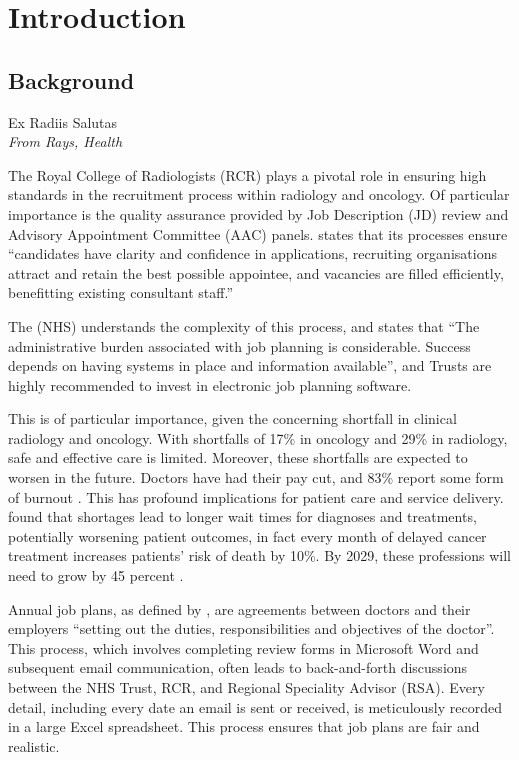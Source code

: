 \chapter{Introduction}
\section{Background} \label{Background}
\epigraph{Ex Radiis Salutas\\\textit{From Rays, Health}}{}
The Royal College of Radiologists (RCR) plays a pivotal role in ensuring high standards in the recruitment process within radiology and oncology. Of particular importance is the quality assurance provided by Job Description (JD) review and Advisory Appointment Committee (AAC) panels.  \textcite{the_royal_college_of_radiologists_clinical_2022} states that its processes ensure “candidates have clarity and confidence in applications, recruiting organisations attract and retain the best possible appointee, and vacancies are filled efficiently, benefitting existing consultant staff.” 

The \textcite{national_health_service_consultant_2017} (NHS) understands the complexity of this process, and states that “The administrative burden associated with job planning is considerable. Success depends on having systems in place and information available”, and Trusts are highly recommended to invest in electronic job planning software.

This is of particular importance, given the concerning shortfall in clinical radiology and oncology. With shortfalls of 17\% in oncology and 29\% in radiology, safe and effective care is limited. Moreover, these shortfalls are expected to worsen in the future. Doctors have had their pay cut, and 83\% report some form of burnout \parencite{the_royal_college_of_radiologists_rcr_2023}. This has profound implications for patient care and service delivery. \textcite{limb_shortages_2022} found that shortages lead to longer wait times for diagnoses and treatments, potentially worsening patient outcomes, in fact every month of delayed cancer treatment increases patients’ risk of death by 10\%. By 2029, these professions will need to grow by 45 percent \parencite{national_health_service_strategic_2018}.

Annual job plans, as defined by \textcite{the_royal_college_of_radiologists_clinical_2022}, are agreements between doctors and their employers “setting out the duties, responsibilities and objectives of the doctor”. This process, which involves completing review forms in Microsoft Word and subsequent email communication, often leads to back-and-forth discussions between the NHS Trust, RCR, and Regional Speciality Advisor (RSA). Every detail, including every date an email is sent or received, is meticulously recorded in a large Excel spreadsheet. This process ensures that job plans are fair and realistic.

